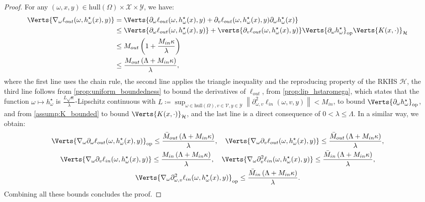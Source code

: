 \begin{proof}
For any $(\omega,x,y)\in\text{hull}(\Omega)\times \mathcal{X}\times \mathcal{Y}$, we have:
\begin{align*}
    \Verts{\nabla_\omega\ell_{out}(\omega, h^\star_\omega(x), y)}&=\Verts{\partial_\omega\ell_{out}(\omega, h^\star_\omega(x), y)+\partial_v\ell_{out}(\omega, h^\star_\omega(x), y)\partial_\omega h^\star_\omega(x)}\\
    &\leq\Verts{\partial_\omega\ell_{out}(\omega, h^\star_\omega(x), y)}+\verts{\partial_v\ell_{out}(\omega, h^\star_\omega(x), y)}\Verts{\partial_\omega h^\star_\omega}_{\op}\Verts{K(x,\cdot)}_\mathcal{H}\\
    &\leq M_{out}\left(1+\frac{M_{in}\kappa}{\lambda}\right)\\
    &\leq\frac{M_{out}\left(\Lambda+M_{in}\kappa\right)}{\lambda},
\end{align*}
where the first line uses the chain rule, the second line applies the triangle inequality and the reproducing property of the RKHS $\mathcal{H}$, the third line follows from \cref{prop:uniform_boundedness} to bound the derivatives of $\ell_{out}$, from \cref{prop:lip_hstaromega}, which states that the function $\omega\mapsto h^\star_\omega$ is $\frac{L\sqrt{\kappa}}{\lambda}$-Lipschitz continuous with $L\coloneqq\sup_{\omega\in\text{hull}(\Omega),v\in\mathcal{V},y\in\mathcal{Y}}\left\|\partial_{\omega, v}^2 \ell_{in}(\omega, v, y)\right\|<M_{in}$, to bound $\Verts{\partial_\omega h^\star_\omega}_{\op}$, and from \cref{assump:K_bounded} to bound $\Verts{K(x,\cdot)}_\mathcal{H}$, and the last line is a direct consequence of $0<\lambda\leq \Lambda$. In a similar way, we obtain:
\begin{gather*}
    \Verts{\nabla_\omega\partial_\omega\ell_{out}(\omega, h^\star_\omega(x), y)}_{\op}\leq\frac{\bar{M}_{out}\left(\Lambda+M_{in}\kappa\right)}{\lambda},\quad\Verts{\nabla_\omega\partial_v \ell_{out}(\omega, h^\star_\omega(x), y)}\leq\frac{\bar{M}_{out}\left(\Lambda+M_{in}\kappa\right)}{\lambda},\\
    \Verts{\nabla_\omega\partial_v \ell_{in}(\omega, h^\star_\omega(x), y)}\leq\frac{M_{in}\left(\Lambda+M_{in}\kappa\right)}{\lambda},\quad\Verts{\nabla_\omega\partial_v^2 \ell_{in}(\omega, h^\star_\omega(x), y)}\leq\frac{\bar{M}_{in}\left(\Lambda+M_{in}\kappa\right)}{\lambda},\\
    \Verts{\nabla_\omega\partial_{\omega, v}^2 \ell_{in}(\omega, h^\star_\omega(x), y)}_{\op}\leq\frac{\bar{M}_{in}\left(\Lambda+M_{in}\kappa\right)}{\lambda}.
\end{gather*}
Combining all these bounds concludes the proof.
\end{proof}

